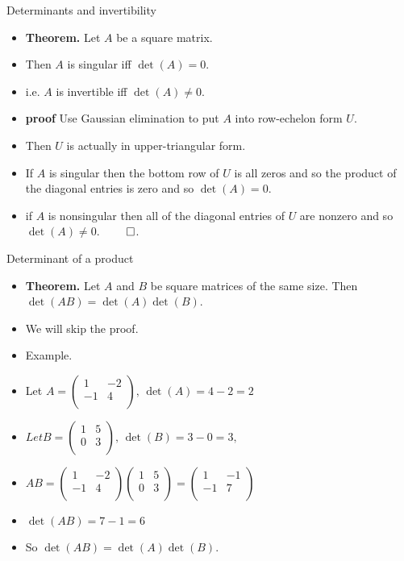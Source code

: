\documentclass[handout]{beamer}
\begin{document}

\begin{frame}{Determinants and invertibility}
\begin{itemize}
\item \textbf{Theorem.} Let $A$ be a square matrix.
\item Then $A$ is singular iff $\det(A) = 0$.
\item i.e. $A$ is invertible iff $\det(A) \not= 0$.
\item \textbf{proof} Use Gaussian elimination to put $A$ into row-echelon
form $U$.
\item Then $U$ is actually in upper-triangular form.
\item If $A$ is singular then the bottom row of $U$ is all zeros and
so the product of the diagonal entries is zero and so $\det(A)=0$.
\item if $A$ is nonsingular then all of the diagonal entries of $U$ are
nonzero and so $\det(A)\not=0$. $\qed$.
\end{itemize}
\end{frame}


\begin{frame}{Determinant of a product}
\begin{itemize}
\item \textbf{Theorem.} Let $A$ and $B$ be square matrices of the same size. Then $\det(AB) = \det(A) \det(B)$.
\item We will skip the proof.
\item Example.
\item Let
$
A =
\begin{pmatrix}
1 & -2 \\
-1 & 4 \\
\end{pmatrix}
\text{, }
\det(A) = 4-2=2
$
\item
$ Let
B =
\begin{pmatrix}
1 & 5 \\
0 & 3 \\
\end{pmatrix}
\text{, }
\det(B) = 3 - 0 = 3,
$
\item
$
AB =
\begin{pmatrix}
1 & -2 \\
-1 & 4 \\
\end{pmatrix}
\begin{pmatrix}
1 & 5 \\
0 & 3 \\
\end{pmatrix}
=
\begin{pmatrix}
1 & -1 \\
-1 & 7 \\
\end{pmatrix}
$
\item $\det(AB) = 7 - 1 = 6$
\item So $\det(AB) = \det(A) \det(B).
$
\end{itemize}
\end{frame}




\end{document}
